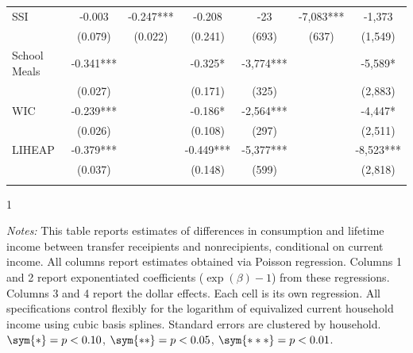 \begin{table}[h!]
\begin{tabular*}{1.36\textwidth}{@{\extracolsep{\fill}}lcccccc}
SSI                & -0.003    & -0.247***     & -0.208      & -23     & -7,083***                           & -1,373                        \\
                   & (0.079)    & (0.022)      & (0.241)      & (693)        & (637)                   & (1,549)                        \\  \addlinespace
School Meals                 & -0.341***   &    & -0.325*       & -3,774***          &                 & -5,589*                         \\
                   & (0.027)  &     & (0.171)       & (325)        &                  & (2,883)                         \\  \addlinespace
WIC                & -0.239***   &   & -0.186*      & -2,564***           &                    & -4,447*                        \\
                   & (0.026)    &  & (0.108)      & (297)               &                & (2,511)                        \\   \addlinespace
LIHEAP             & -0.379*** &  & -0.449***   & -5,377***             &               & -8,523***                     \\
                   & (0.037) &  & (0.148)   & (599)                 &           & (2,818)                 \\ \addlinespace \bottomrule   
                \end{tabular*}
                \begin{spacing}{1}
                    \begin{tablenotes}
                          \item \footnotesize \textit{Notes:} This table reports estimates of differences in consumption and lifetime income between transfer receipients and nonrecipients, conditional on current income. All columns report estimates obtained via Poisson regression. Columns 1 and 2 report exponentiated coefficients ($\exp(\beta)-1$) from these regressions. Columns 3 and 4 report the dollar effects. Each cell is its own regression. All specifications control flexibly for the logarithm of equivalized current household income using cubic basis splines. Standard errors are clustered by household. $\sym{*} = p < 0.10$, $\sym{**} = p < 0.05$, $\sym{***} = p < 0.01$.
                          \end{tablenotes}
                           \end{spacing}
                    \end{table}